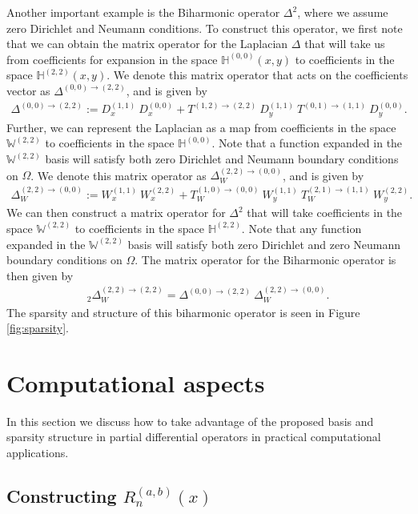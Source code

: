 \documentclass[11pt, oneside]{article}   	%
\newcommand{\hdop}{H}
\newcommand{\bighdop}{\mathbb{\hdop}}
\newcommand{\bighdopoo}{{\mathbb{\hdop}^{(0,0)}}}
\newcommand{\genjac}{R}
\newcommand{\laplacewtt}{\Delta_W^{(2,2)\to(0,0)}}
\newcommand{\laplaceoo}{\Delta^{(0,0)\to(2,2)}}
\newcommand{\biharmonic}{_2\Delta_W^{(2,2)\to(2,2)}}
\newcommand{\bigW}{\mathbb{W}}
\begin{document}
Another important example is the Biharmonic operator $\Delta^2$, where we assume zero Dirichlet and Neumann conditions. To construct this operator, we first note that we can obtain the matrix operator for the Laplacian $\Delta$ that will take us from coefficients for expansion in the space $\bighdopoo(x,y)$ to coefficients in the space $\bighdop^{(2,2)}(x,y)$. We denote this matrix operator that acts on the coefficients vector as $\laplaceoo$, and is given by
\begin{align*}
    \laplaceoo := D_x^{(1,1)} \: D_x^{(0,0)} + T^{(1,2)\to(2,2)} \: D_y^{(1,1)} \: T^{(0,1)\to(1,1)} \: D_y^{(0,0)}.
\end{align*}
Further, we can represent the Laplacian as a map from coefficients in the space $\bigW^{(2,2)}$ to coefficients in the space $\bighdopoo$. Note that a function expanded in the $\bigW^{(2,2)}$ basis will satisfy both zero Dirichlet and Neumann boundary conditions on $\Omega$. We denote this matrix operator as $\laplacewtt$, and is given by
\begin{align*}
	\laplacewtt := W_x^{(1,1)} \: W_x^{(2,2)} + T_W^{(1,0)\to(0,0)} \: W_y^{(1,1)} \: T_W^{(2,1)\to(1,1)} \: W_y^{(2,2)}.
\end{align*}
We can then construct a matrix operator for $\Delta^2$ that will take coefficients in the space $\bigW^{(2,2)}$ to coefficients in the space $\bighdop^{(2,2)}$. Note that any function expanded in the $\bigW^{(2,2)}$ basis will satisfy both zero Dirichlet and zero Neumann boundary conditions on $\Omega$. The matrix operator for the Biharmonic operator is then given by
\begin{align*}
	\biharmonic = \laplaceoo \: \laplacewtt.
\end{align*}
The sparsity and structure of this biharmonic operator is seen in Figure \ref{fig:sparsity}.



\section{Computational aspects}\label{Section:Computation}

In this section we discuss how to take advantage of the proposed basis and sparsity structure in partial differential operators in practical computational applications. 

\subsection{Constructing $\genjac_n^{(a,b)}(x)$}
\end{document}
